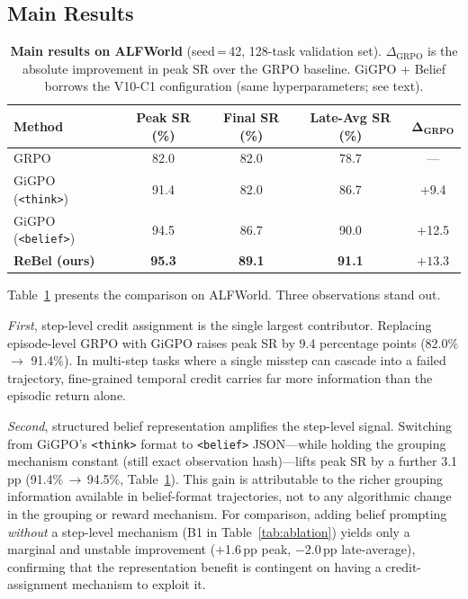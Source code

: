 \subsection{Main Results}
\label{sec:main_results}

\begin{table}[t]
  \centering
  \caption{%
    \textbf{Main results on ALFWorld} (seed\,=\,42, 128-task validation set).
    $\Delta_{\text{GRPO}}$ is the absolute improvement in peak SR over the
    GRPO baseline.
    GiGPO + Belief borrows the V10-C1 configuration (same hyperparameters;
    see text).
  }
  \label{tab:main_results}
  \vspace{4pt}
  \small
  \renewcommand{\arraystretch}{1.15}
  \begin{tabular}{@{}lcccc@{}}
    \toprule
    \textbf{Method}
      & \textbf{Peak SR (\%)}
      & \textbf{Final SR (\%)}
      & \textbf{Late-Avg SR (\%)}
      & $\boldsymbol{\Delta}_{\textbf{GRPO}}$ \\
    \midrule
    GRPO
      & 82.0 & 82.0 & 78.7 & --- \\
    GiGPO (\texttt{<think>})
      & 91.4 & 82.0 & 86.7 & $+$9.4 \\
    GiGPO (\texttt{<belief>})
      & 94.5 & 86.7 & 90.0 & $+$12.5 \\
    \textbf{ReBel (ours)}
      & \textbf{95.3} & \textbf{89.1} & \textbf{91.1} & $\mathbf{+13.3}$ \\
    \bottomrule
  \end{tabular}
\end{table}

Table~\ref{tab:main_results} presents the comparison on ALFWorld.
Three observations stand out.

\textit{First}, step-level credit assignment is the single largest contributor.
Replacing episode-level GRPO with GiGPO raises peak SR by 9.4 percentage points
(82.0\% $\to$ 91.4\%).
In multi-step tasks where a single misstep can cascade into a failed trajectory,
fine-grained temporal credit carries far more information than the episodic
return alone.

\textit{Second}, structured belief representation amplifies the step-level signal.
Switching from GiGPO's \texttt{<think>} format to \texttt{<belief>} JSON---while
holding the grouping mechanism constant (still exact observation hash)---lifts
peak SR by a further 3.1\,pp (91.4\%\,$\to$\,94.5\%, Table~\ref{tab:main_results}).
This gain is attributable to the richer grouping information available in
belief-format trajectories, not to any algorithmic change in the grouping or
reward mechanism.
For comparison, adding belief prompting \emph{without} a step-level mechanism
(B1 in Table~\ref{tab:ablation}) yields only a marginal and unstable improvement
($+$1.6\,pp peak, $-$2.0\,pp late-average), confirming that the representation
benefit is contingent on having a credit-assignment mechanism to exploit it.


